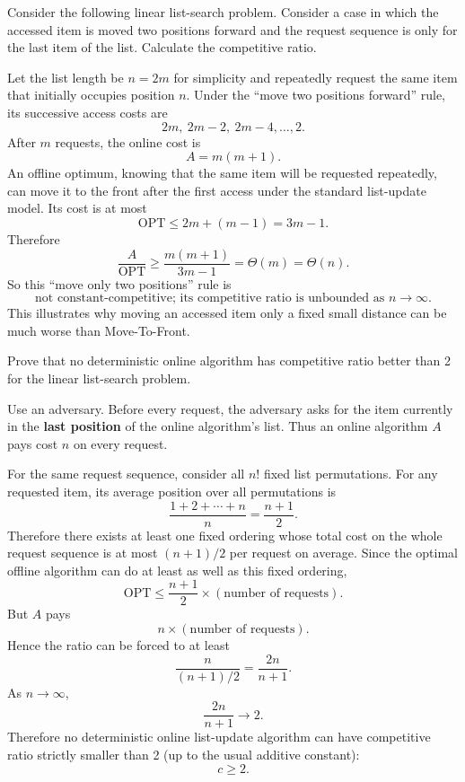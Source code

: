 \documentclass[11pt,a4paper]{article}
\newcommand{\OPT}{\mathrm{OPT}}
\begin{document}
\begin{qaquestion}
Consider the following linear list-search problem. Consider a case in which the accessed item is moved two positions forward and the request sequence is only for the last item of the list. Calculate the competitive ratio.
\end{qaquestion}
\begin{qaanswer}[Answer 7(b)(i)]
Let the list length be \(n=2m\) for simplicity and repeatedly request the same item that initially occupies position \(n\). Under the ``move two positions forward'' rule, its successive access costs are
\[
2m,\ 2m-2,\ 2m-4,\ldots,2.
\]
After \(m\) requests, the online cost is
\[
A=m(m+1).
\]
An offline optimum, knowing that the same item will be requested repeatedly, can move it to the front after the first access under the standard list-update model. Its cost is at most
\[
\OPT\le 2m+(m-1)=3m-1.
\]
Therefore
\[
\frac{A}{\OPT}\ge
\frac{m(m+1)}{3m-1}=\Theta(m)=\Theta(n).
\]
So this ``move only two positions'' rule is
\[
\boxed{\text{not constant-competitive; its competitive ratio is unbounded as }n\to\infty.}
\]
This illustrates why moving an accessed item only a fixed small distance can be much worse than Move-To-Front.
\end{qaanswer}

\begin{qaquestion}
Prove that no deterministic online algorithm has competitive ratio better than 2 for the linear list-search problem.
\end{qaquestion}
\begin{qaanswer}[Answer 7(b)(ii)]
Use an adversary. Before every request, the adversary asks for the item currently in the \textbf{last position} of the online algorithm's list. Thus an online algorithm \(A\) pays cost \(n\) on every request.

For the same request sequence, consider all \(n!\) fixed list permutations. For any requested item, its average position over all permutations is
\[
\frac{1+2+\cdots+n}{n}=\frac{n+1}{2}.
\]
Therefore there exists at least one fixed ordering whose total cost on the whole request sequence is at most \((n+1)/2\) per request on average. Since the optimal offline algorithm can do at least as well as this fixed ordering,
\[
\OPT\le \frac{n+1}{2}\times(\text{number of requests}).
\]
But \(A\) pays
\[
n\times(\text{number of requests}).
\]
Hence the ratio can be forced to at least
\[
\frac{n}{(n+1)/2}=\frac{2n}{n+1}.
\]
As \(n\to\infty\),
\[
\frac{2n}{n+1}\to2.
\]
Therefore no deterministic online list-update algorithm can have competitive ratio strictly smaller than 2 (up to the usual additive constant):
\[
\boxed{c\ge2}.
\]
\end{qaanswer}
\end{document}
